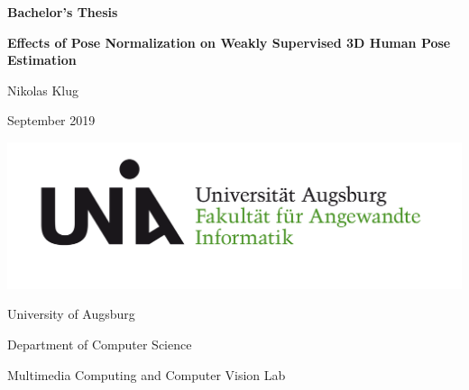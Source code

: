 \begin{titlepage}
	\centering
	
	\large{\textbf{Bachelor's Thesis}}
	\vspace{0.4cm}
	
	\huge{\textbf{Effects of Pose Normalization on Weakly Supervised 3D Human Pose Estimation}}\par
	
	\vspace{1cm}
	\Large{Nikolas Klug}
	
	\vspace{1cm}
	\Large{September 2019}
	
	\vspace{\fill}
	\includegraphics[scale=0.5]{figures/Uni_Aug_Logo_FAI_RGB.png}
	\vspace{5mm}
	
	University of Augsburg
	
	Department of Computer Science
	
	Multimedia Computing and Computer Vision Lab
\end{titlepage}

\normalfont
\restoregeometry
\pagebreak

